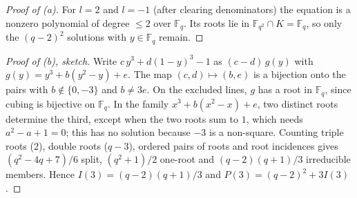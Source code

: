 \begin{proof}[Proof of (a)]
For $l=2$ and $l=-1$ (after clearing denominators) the equation is a nonzero polynomial of degree $\le2$ over $\mathbb F_q$. Its roots lie in
$\mathbb F_{q^2}\cap K=\mathbb F_q$, so only the $(q-2)^2$ solutions with $y\in\mathbb F_q$ remain.
\end{proof}

\begin{proof}[Proof of (b), sketch]
Write $c\,y^3+d(1-y)^3-1$ as $(c-d)\,g(y)$ with $g(y)=y^3+b(y^2-y)+e$. The map $(c,d)\mapsto(b,e)$ is a bijection onto the pairs with
$b\notin\{0,-3\}$ and $b\ne3e$. On the excluded lines, $g$ has a root in $\mathbb F_q$, since cubing is bijective on $\mathbb F_q$. In the family
$x^3+b(x^2-x)+e$, two distinct roots determine the third, except when the two roots sum to $1$, which needs $a^2-a+1=0$; this has no solution because
$-3$ is a non-square. Counting triple roots ($2$), double roots ($q-3$), ordered pairs of roots and root incidences gives
$(q^2-4q+7)/6$ split, $(q^2+1)/2$ one-root and $(q-2)(q+1)/3$ irreducible members. Hence $I(3)=(q-2)(q+1)/3$ and $P(3)=(q-2)^2+3I(3)$.
\end{proof}

